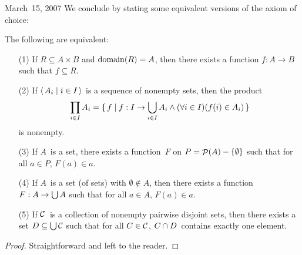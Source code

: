 \begin{lecture}{March~15, 2007}
We conclude by stating some equivalent versions of the axiom of choice:
\begin{thm}
The following are equivalent:
\begin{enumerate}[itemsep=0pt]
\item[(1)] If \(R\subseteq A\times B\) and \(\operatorname{domain}(R)=A\), then there exists a function \(f:A\to B\) such that \(f\subseteq R\).
\item[(2)] If \(\langle\,{A_i}\mid{i\in I}\,\rangle\) is a sequence of nonempty sets, then the product
\[\prod_{i\in I}A_i=\{\,f\mid f:I\to\bigcup_{i\in I}A_i\land(\forall i\in I)(f(i)\in A_i)\,\}\]
is nonempty.
\item[(3)] If \(A\)~is a set, there exists a function~\(F\) on \(P=\mathop{\mathcal{P}}(A)-\{\emptyset\}\) such that for all \(a\in P\), \(F(a)\in a\).
\item[(4)] If \(A\)~is a set (of sets) with \(\emptyset\not\in A\), then there exists a function \(F:A\to\bigcup A\) such that for all \(a\in A\), \(F(a)\in a\).
\item[(5)] If \(\mathcal{C}\)~is a collection of nonempty pairwise disjoint sets, then there exists a set \(D\subseteq\bigcup\mathcal{C}\) such that for all \(C\in\mathcal{C}\), \(C\cap D\)~contains exactly one element.
\end{enumerate}
\end{thm}
\begin{proof}
Straightforward and left to the reader.
\end{proof}
\end{lecture}

